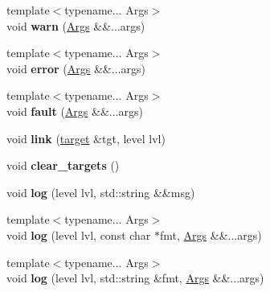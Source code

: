 \begin{DoxyCompactItemize}
\item 
{\footnotesize template$<$typename... Args$>$ }\\void {\bfseries warn} (\hyperlink{structArgs}{Args} \&\&...args)\hypertarget{classgxx_1_1log_1_1logger_a69482bf2f17e1526f1053c6118073da8}{}\label{classgxx_1_1log_1_1logger_a69482bf2f17e1526f1053c6118073da8}

\item 
{\footnotesize template$<$typename... Args$>$ }\\void {\bfseries error} (\hyperlink{structArgs}{Args} \&\&...args)\hypertarget{classgxx_1_1log_1_1logger_a065b161a99b467f665356c6903de346a}{}\label{classgxx_1_1log_1_1logger_a065b161a99b467f665356c6903de346a}

\item 
{\footnotesize template$<$typename... Args$>$ }\\void {\bfseries fault} (\hyperlink{structArgs}{Args} \&\&...args)\hypertarget{classgxx_1_1log_1_1logger_afebdf22a5d37d2a55e4a0447cea85166}{}\label{classgxx_1_1log_1_1logger_afebdf22a5d37d2a55e4a0447cea85166}

\item 
void {\bfseries link} (\hyperlink{classgxx_1_1log_1_1target}{target} \&tgt, level lvl)\hypertarget{classgxx_1_1log_1_1logger_a588a6f05c60df2871d75dbcf58c2fa08}{}\label{classgxx_1_1log_1_1logger_a588a6f05c60df2871d75dbcf58c2fa08}

\item 
void {\bfseries clear\+\_\+targets} ()\hypertarget{classgxx_1_1log_1_1logger_a148f0cfe3888ef3555124fb1765251bf}{}\label{classgxx_1_1log_1_1logger_a148f0cfe3888ef3555124fb1765251bf}

\item 
void {\bfseries log} (level lvl, std\+::string \&\&msg)\hypertarget{classgxx_1_1log_1_1logger_afe58a9eaef28534e4af360b1d65c8ba6}{}\label{classgxx_1_1log_1_1logger_afe58a9eaef28534e4af360b1d65c8ba6}

\item 
{\footnotesize template$<$typename... Args$>$ }\\void {\bfseries log} (level lvl, const char $\ast$fmt, \hyperlink{structArgs}{Args} \&\&...args)\hypertarget{classgxx_1_1log_1_1logger_ad2fb8975812306f8645d4695093627e8}{}\label{classgxx_1_1log_1_1logger_ad2fb8975812306f8645d4695093627e8}

\item 
{\footnotesize template$<$typename... Args$>$ }\\void {\bfseries log} (level lvl, std\+::string \&fmt, \hyperlink{structArgs}{Args} \&\&...args)\hypertarget{classgxx_1_1log_1_1logger_a0271e182b5945500a1dfebca89d00054}{}\label{classgxx_1_1log_1_1logger_a0271e182b5945500a1dfebca89d00054}


\end{DoxyCompactItemize}
